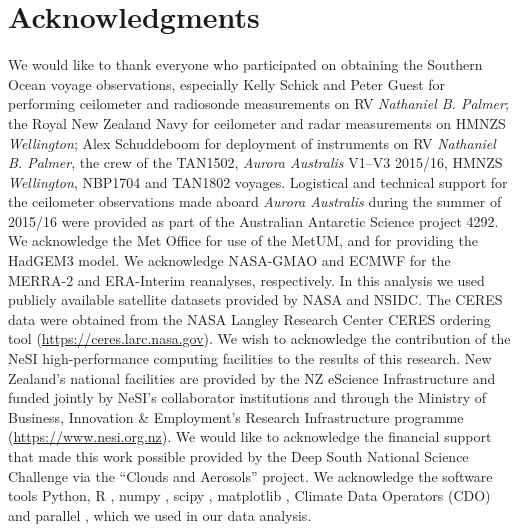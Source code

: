 \section*{Acknowledgments}

We would like to thank everyone who participated on obtaining the Southern
Ocean voyage observations, especially Kelly Schick and Peter Guest for
performing ceilometer and radiosonde measurements on RV \textit{Nathaniel B.
Palmer}; the Royal New Zealand Navy for ceilometer and radar measurements on
HMNZS \textit{Wellington}; Alex Schuddeboom for deployment of instruments on RV
\textit{Nathaniel B. Palmer}, the crew of the TAN1502, \textit{Aurora
Australis} V1--V3 2015/16, HMNZS \textit{Wellington}, NBP1704 and TAN1802
voyages.  Logistical and technical support for the ceilometer observations made
aboard \textit{Aurora Australis} during the summer of 2015/16 were provided as
part of the Australian Antarctic Science project 4292. We acknowledge the Met
Office for use of the MetUM, and for providing the HadGEM3 model. We
acknowledge NASA-GMAO and ECMWF for the MERRA-2 and ERA-Interim reanalyses,
respectively. In this analysis we used publicly available satellite datasets
provided by NASA and NSIDC. The CERES data were obtained from the NASA Langley
Research Center CERES ordering tool (\url{https://ceres.larc.nasa.gov}). We
wish to acknowledge the contribution of the NeSI high-performance computing
facilities to the results of this research. New Zealand's national facilities
are provided by the NZ eScience Infrastructure and funded jointly by NeSI's
collaborator institutions and through the Ministry of Business, Innovation \&
Employment's Research Infrastructure programme (\url{https://www.nesi.org.nz}).
We would like to acknowledge the financial support that made this work possible
provided by the Deep South National Science Challenge via the ``Clouds and
Aerosols'' project.  We acknowledge the software tools Python, R \citep{r},
numpy \citep{oliphant2006}, scipy \citep{scipy}, matplotlib \citep{hunter2007},
Climate Data Operators (CDO) \citep{schulzweida2018} and parallel
\citep{tange2011}, which we used in our data analysis.
